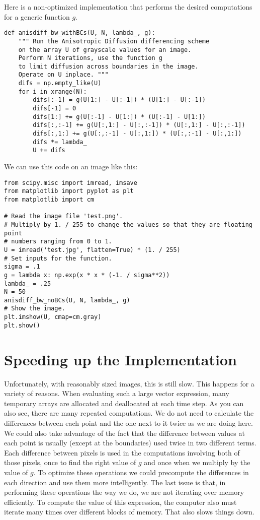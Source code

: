 Here is a non-optimized implementation that performs the desired computations for a generic function $g$.
\begin{lstlisting}
def anisdiff_bw_withBCs(U, N, lambda_, g):
    """ Run the Anisotropic Diffusion differencing scheme
    on the array U of grayscale values for an image.
    Perform N iterations, use the function g
    to limit diffusion across boundaries in the image.
    Operate on U inplace. """
    difs = np.empty_like(U)
    for i in xrange(N):
        difs[:-1] = g(U[1:] - U[:-1]) * (U[1:] - U[:-1])
        difs[-1] = 0
        difs[1:] += g(U[:-1] - U[1:]) * (U[:-1] - U[1:])
        difs[:,:-1] += g(U[:,1:] - U[:,:-1]) * (U[:,1:] - U[:,:-1])
        difs[:,1:] += g(U[:,:-1] - U[:,1:]) * (U[:,:-1] - U[:,1:])
        difs *= lambda_
        U += difs
\end{lstlisting}

We can use this code on an image like this:
\begin{lstlisting}
from scipy.misc import imread, imsave
from matplotlib import pyplot as plt
from matplotlib import cm

# Read the image file 'test.png'.
# Multiply by 1. / 255 to change the values so that they are floating point
# numbers ranging from 0 to 1.
U = imread('test.jpg', flatten=True) * (1. / 255)
# Set inputs for the function.
sigma = .1
g = lambda x: np.exp(x * x * (-1. / sigma**2))
lambda_ = .25
N = 50
anisdiff_bw_noBCs(U, N, lambda_, g)
# Show the image.
plt.imshow(U, cmap=cm.gray)
plt.show()
\end{lstlisting}

\section*{Speeding up the Implementation}
Unfortunately, with reasonably sized images, this is still slow.
This happens for a variety of reasons.
When evaluating such a large vector expression, many temporary arrays are allocated and deallocated at each time step.
As you can also see, there are many repeated computations.
We do not need to calculate the differences between each point and the one next to it twice as we are doing here.
We could also take advantage of the fact that the difference between values at each point is usually (except at the boundaries) used twice in two different terms.
Each difference between pixels is used in the computations involving both of those pixels, once to find the right value of $g$ and once when we multiply by the value of $g$.
To optimize these operations we could precompute the differences in each direction and use them more intelligently.
The last issue is that, in performing these operations the way we do, we are not iterating over memory efficiently.
To compute the value of this expression, the computer also must iterate many times over different blocks of memory.
That also slows things down.


